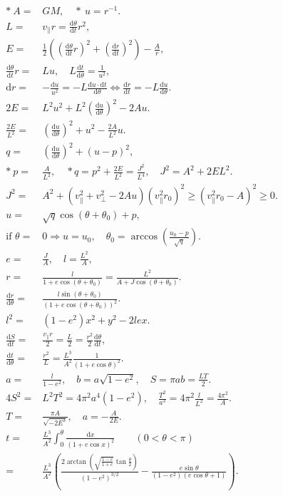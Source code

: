 \documentclass{article}
\begin{document}
\begin{align}
*\ A=&GM,\quad*\ u=r^{-1}.\\
L=&v_{\parallel}r=\frac{\mathrm d\theta}{\mathrm dt}r^2,\\
E=&\frac12\left(\left(\frac{\mathrm d\theta}{\mathrm dt}r\right)^2+\left(\frac{\mathrm dr}{\mathrm dt}\right)^2\right)-\frac{A}{r},\\
\frac{\mathrm d\theta}{\mathrm dt}r=&Lu,\quad L\frac{\mathrm dt}{\mathrm d\theta}=\frac{1}{u^2},\\
\mathrm dr=&-\frac{\mathrm du}{u^2}=-L\frac{\mathrm du\cdot \mathrm dt}{\mathrm d\theta}\iff\frac{\mathrm dr}{\mathrm dt}=-L\frac{\mathrm du}{\mathrm d\theta}.\\
2E=&L^2u^2+L^2\left(\frac{\mathrm du}{\mathrm d\theta}\right)^2-2A u.\\
\frac{2E}{L^2}=&\left(\frac{\mathrm du}{\mathrm d\theta}\right)^2+u^2-\frac{2A}{L^2}u.\\
q=&\left(\frac{\mathrm du}{\mathrm d\theta}\right)^2+(u-p)^2,\\
*\ p=&\frac{A}{L^2},\quad*q=p^2+\frac{2E}{L^2}=\frac{J^2}{L^{4}},\quad J^2=A^2+2EL^2.\\
J^2=&A^2+(v_\parallel^2+v_\bot^2-2A u)(v_\parallel^2r_0)^2\ge(v_\parallel^2r_0-A)^2\ge0.\\
u=&\sqrt q\cos(\theta+\theta_0)+p,\\
\text{if } \theta=&0\Longrightarrow u=u_0,\quad\theta_0=\arccos\left(\frac{u_0-p}{\sqrt q}\right).\\
e=&\frac JA,\quad l=\frac{L^2}{A},\\
r=&\frac{l}{1+e\cos(\theta+\theta_0)}=\frac{L^2}{A+J\cos(\theta+\theta_0)}.\\
\frac{\mathrm dr}{\mathrm d\theta}=&\frac{l\sin(\theta+\theta_0)}{(1+e\cos(\theta+\theta_0))^2}.\\
l^2=&(1-e^2)x^2+y^2-2lex.\\
\frac{\mathrm dS}{\mathrm dt}=&\frac{v_\parallel r}{2}=\frac L2=\frac{r^2}{2}\frac{\mathrm d\theta}{\mathrm dt},\\
\frac{\mathrm dt}{\mathrm d\theta}=&\frac{r^2}{L}=\frac{L^3}{A^2}\frac1{(1+e\cos\theta)^2}.\\
a=&\frac{l}{1-e^2},\quad b=a\sqrt{1-e^2},\quad S=\pi ab=\frac{LT}{2}.\\
4S^2=&L^2T^2=4\pi^2a^4(1-e^2),\quad\frac{T^2}{a^3}=4\pi^2\frac{l}{L^2}=\frac{4\pi^2}{A}.\\
T=&\frac{\pi A}{\sqrt{-2E^3}},\quad a=-\frac{A}{2E}.\\
t=&\frac{L^3}{A^2}\int_{0}^{\theta}\frac{\mathrm dx}{(1+e\cos x)^2}\quad\quad(0<\theta<\pi)\\
=&\frac{L^3}{A^2}\left(\frac{2\arctan\left(\sqrt{\frac{1-e}{1+e}}\tan\frac\theta2\right)}{\left(1-e^2\right)^{3/2}}-\frac{e\sin\theta}{\left(1-e^2\right)(e\cos\theta+1)}\right).
\end{align}
\end{document}
